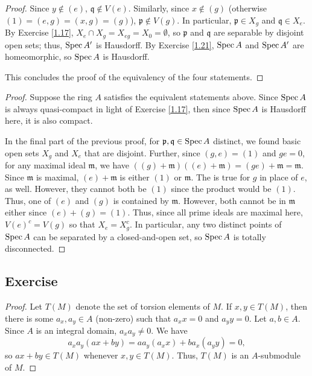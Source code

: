 \begin{proof}
Since $y \not\in (e)$, $\mathfrak{q} \not\in V(e)$. Similarly, since $x \not\in (g)$ (otherwise $(1) = (e,g) = (x,g) = (g)$), $\mathfrak{p} \not\in V(g)$. In particular, $\mathfrak{p} \in X_g$ and $\mathfrak{q} \in X_e$.
By Exercise \ref{1.17}, $X_e \cap X_g = X_{eg} = X_0 = \emptyset$, so $\mathfrak{p}$ and $\mathfrak{q}$ are separable by disjoint open sets; thus, $\operatorname{Spec} A'$ is Hausdorff. By Exercise \ref{1.21}, $\operatorname{Spec} A$ and $\operatorname{Spec} A'$
are homeomorphic, so $\operatorname{Spec} A$ is Hausdorff.

This concludes the proof of the equivalency of the four statements.
\end{proof}

\begin{proof}
Suppose the ring $A$ satisfies the equivalent statements above. Since $\operatorname{Spec} A$ is always quasi-compact in light of Exercise \ref{1.17}, then since $\operatorname{Spec} A$ is Hausdorff here, it is also compact.

In the final part of the previous proof, for $\mathfrak{p},\mathfrak{q} \in \operatorname{Spec} A$ distinct, we found basic open sets $X_g$ and $X_e$ that are disjoint. Further, since $(g,e) = (1)$ and $ge = 0$, for any
maximal ideal $\mathfrak{m}$, we have $((g) + \mathfrak{m})((e) + \mathfrak{m}) = (ge) + \mathfrak{m} = \mathfrak{m}$. Since $\mathfrak{m}$ is maximal, $(e) + \mathfrak{m}$ is either $(1)$ or $\mathfrak{m}$. 
The is true for $g$ in place of $e$, as well. However, they cannot both be $(1)$ since the product would be $(1)$. Thus, one of $(e)$ and $(g)$ is contained by $\mathfrak{m}$. However, both cannot be in $\mathfrak{m}$
either since $(e) + (g) = (1)$. Thus, since all prime ideals are maximal here, $V(e)^c = V(g)$ so that $X_e = X_g^c$. In particular, any two distinct points of $\operatorname{Spec} A$ can be separated by a closed-and-open set, so 
$\operatorname{Spec} A$ is totally disconnected.
\end{proof}

\subsection{Exercise}\label{3.12}

\begin{proof}
Let $T(M)$ denote the set of torsion elements of $M$. If $x,y \in T(M)$, then there is some $a_x,a_y \in A$ (non-zero) such that $a_x x = 0$ and $a_y y = 0$. Let $a,b \in A$. Since
$A$ is an integral domain, $a_x a_y \neq 0$. We have
$$a_xa_y(ax + by) = aa_y(a_x x) + ba_x(a_y y) = 0,$$
so $a x + b y \in T(M)$ whenever $x,y \in T(M)$. Thus, $T(M)$ is an $A$-submodule of $M$.
\end{proof}

